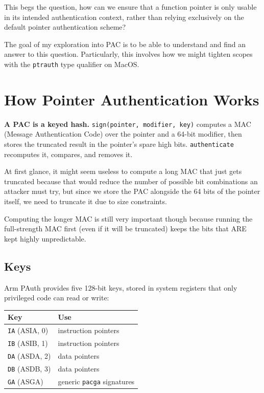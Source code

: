 This begs the question, how can we ensure that a function pointer is only usable in its intended authentication context, rather than relying exclusively on the default pointer authentication scheme?

The goal of my exploration into PAC is to be able to understand and find an answer to this question. Particularly, this involves how we might tighten scopes with the \texttt{\uscore{}\uscore{}ptrauth} type qualifier on MacOS.

\section{How Pointer Authentication Works}

\textbf{A PAC is a keyed hash.} \texttt{sign(pointer, modifier, key)} computes a MAC (Message Authentication Code) over the pointer and a 64-bit modifier, then stores the truncated result in the pointer's spare high bits. \texttt{authenticate} recomputes it, compares, and removes it.

At first glance, it might seem useless to compute a long MAC that just gets truncated because that would reduce the number of possible bit combinations an attacker must try, but since we store the PAC alongside the 64 bits of the pointer itself, we need to truncate it due to size constraints.

Computing the longer MAC is still very important though because running the full-strength MAC first (even if it will be truncated) keeps the bits that ARE kept highly unpredictable.

\subsection{Keys}

Arm PAuth provides five 128-bit keys, stored in system registers that only privileged code can read or write:

\begin{tabular}{|l|l|}
\hline
Key & Use \\
\hline
\texttt{IA} (ASIA, 0) & instruction pointers \\
\hline
\texttt{IB} (ASIB, 1) & instruction pointers \\
\hline
\texttt{DA} (ASDA, 2) & data pointers \\
\hline
\texttt{DB} (ASDB, 3) & data pointers \\
\hline
\texttt{GA} (ASGA) & generic \texttt{pacga} signatures \\
\hline
\end{tabular}

